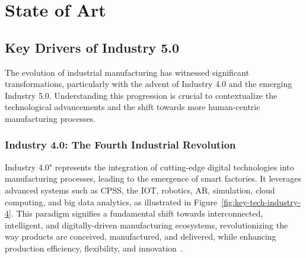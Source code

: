 \chapter{State of Art}%
\label{chapter:stateofart}



\section{Key Drivers of Industry 5.0}
\label{section:industry-evolution}

The evolution of industrial manufacturing has witnessed significant transformations, particularly with the advent of Industry 4.0 and the emerging Industry 5.0. Understanding this progression is crucial to contextualize the technological advancements and the shift towards more human-centric manufacturing processes.

\subsection{Industry 4.0: The Fourth Industrial Revolution}

Industry 4.0" represents the integration of cutting-edge digital technologies into manufacturing processes, leading to the emergence of smart factories. It leverages advanced systems such as \ac{CPSS}, the \ac{IOT}, robotics, \ac{AR}, simulation, cloud computing, and big data analytics, as illustrated in Figure~\ref{fig:key-tech-industry-4}. This paradigm signifies a fundamental shift towards interconnected, intelligent, and digitally-driven manufacturing ecosystems, revolutionizing the way products are conceived, manufactured, and delivered, while enhancing production efficiency, flexibility, and innovation~\cite{Moller2022, Ahmed2022}.

